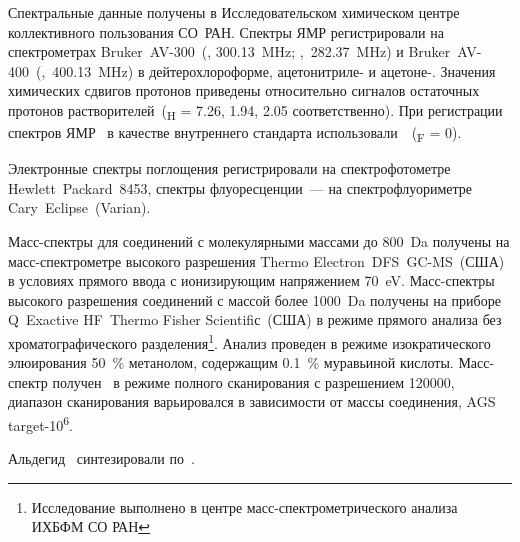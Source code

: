 Спектральные данные получены в Исследовательском химическом центре коллективного пользования СО~РАН.
Спектры ЯМР регистрировали на спектрометрах Bruker~AV-300~(, \SI{300.13}{\mega\hertz}; ,~\SI{282.37}{\mega\hertz}) и Bruker~AV-400~(,~\SI{400.13}{\mega\hertz}) в дейтерохлороформе, \mbox{ацетонитриле-} и \mbox{ацетоне-}.
Значения химических сдвигов протонов приведены относительно сигналов остаточных протонов растворителей~(\chemdelta{}\textsubscript{H} = 7.26, 1.94, 2.05 \si{\ppm} соответственно).
При регистрации спектров ЯМР~ в качестве внутреннего стандарта использовали~~(\chemdelta{}\textsubscript{F} = \SI{0}{\ppm}).

Электронные спектры поглощения регистрировали на спектрофотометре Hewlett~Packard~8453, спектры флуоресценции~--- на спектрофлуориметре Cary~Eclipse~(Varian).

Масс-спектры для соединений с молекулярными массами до \SI{800}{\dalton} получены на масс-спектрометре высокого разрешения Thermo Electron~DFS~GC-MS~(США) в условиях прямого ввода с ионизирующим напряжением \SI{70}{\electronvolt}.
Масс­-спектры высокого разрешения соединений с массой более \SI{1000}{\dalton} получены на приборе Q~Exactive HF~Thermo Fisher Scientifiс~(США) в режиме прямого анализа без хроматографического разделения\footnote{Исследование выполнено в центре масс-спектрометрического анализа ИХБФМ СО РАН}.
Анализ проведен в режиме изократического элюирования \SI{50}{\percent} метанолом, содержащим \SI{0.1}{\percent} муравьиной кислоты. Масс-спектр получен  в режиме полного сканирования с разрешением \num{120000}, диапазон сканирования варьировался в зависимости от массы соединения, AGS target-10\textsuperscript{6}.

Альдегид~ синтезировали по~\cite{2016a,2010}.

